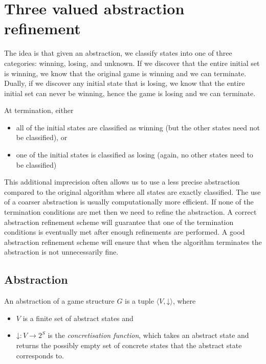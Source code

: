 \documentclass{book}
\newcommand{\concrete}[1]{#1\mathord{\downarrow}}
\theoremstyle{definition}
\begin{document}
\section{Three valued abstraction refinement}

The idea is that given an abstraction, we classify states into one of three categories: winning, losing, and unknown. If we discover that the entire initial set is winning, we know that the original game is winning and we can terminate. Dually, if we discover any initial state that is losing, we know that the entire initial set can never be winning, hence the game is losing and we can terminate. 

At termination, either 
\begin{itemize}
\item all of the initial states are classified as winning (but the other states need not be classified), or
\item one of the initial states is classified as losing (again, no other states need to be classified)
\end{itemize}

This additional imprecision often allows us to use a less precise abstraction compared to the original algorithm where all states are exactly classified. The use of a coarser abstraction is usually computationally more efficient. If none of the termination conditions are met then we need to refine the abstraction. A correct abstraction refinement scheme will guarantee that one of the termination conditions is eventually met after enough refinements are performed. A good abstraction refinement scheme will ensure that when the algorithm terminates the abstraction is not unnecessarily fine.

\subsection{Abstraction}

An abstraction of a game structure $G$ is a tuple $\langle V, \concrete{}\rangle$, where 
\begin{itemize}
    \item $V$ is a finite set of abstract states and 
    \item $\concrete{} : V \rightarrow 2^S $ is the \emph{concretisation function}, which takes an abstract state and returns the possibly empty set of concrete states that the abstract state corresponds to.  
\end{itemize}
        
\end{document}
